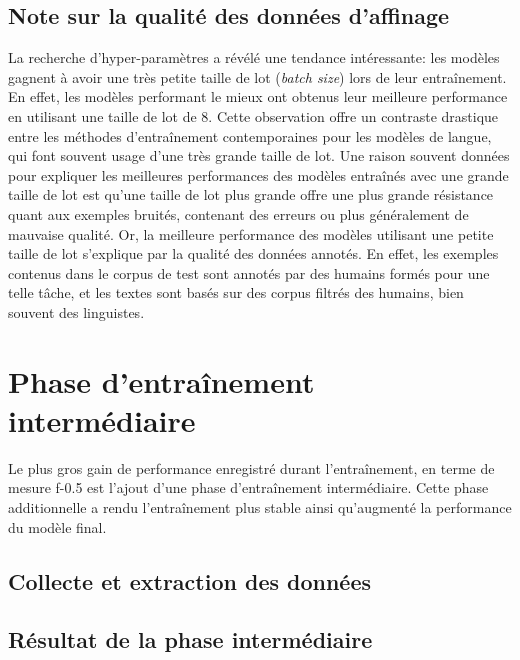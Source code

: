 \documentclass[12pt,twoside,maitrise]{dms}
\theoremstyle{definition}
\numberwithin{equation}{section}
\numberwithin{table}{chapter}
\numberwithin{figure}{chapter}
\begin{document}

\subsection{Note sur la qualité des données d'affinage}
La recherche d'hyper-paramètres a révélé une tendance intéressante:
les modèles gagnent à avoir une très petite taille de lot
(\textit{batch size}) lors de leur entraînement. En effet, les modèles
performant le mieux ont obtenus leur meilleure performance en
utilisant une taille de lot de 8. Cette observation offre un contraste
drastique entre les méthodes d'entraînement contemporaines pour les
modèles de langue, qui font souvent usage d'une très grande taille de
lot. Une raison souvent données pour expliquer les meilleures
performances des modèles entraînés avec une grande taille de lot est
qu'une taille de lot plus grande offre une plus grande résistance
quant aux exemples bruités, contenant des erreurs ou plus généralement
de mauvaise qualité. Or, la meilleure performance des modèles
utilisant une petite taille de lot s'explique par la qualité des
données annotés. En effet, les exemples contenus dans le corpus de
test sont annotés par des humains formés pour une telle tâche, et les
textes sont basés sur des corpus filtrés des humains, bien souvent des
linguistes.
\section{Phase d'entraînement intermédiaire}
Le plus gros gain de performance enregistré durant l'entraînement, en
terme de mesure f-0.5 est l'ajout d'une phase d'entraînement
intermédiaire. Cette phase additionnelle a rendu l'entraînement plus
stable ainsi qu'augmenté la performance du modèle final.
\subsection{Collecte et extraction des données}

\subsection{Résultat de la phase intermédiaire}
\end{document}
